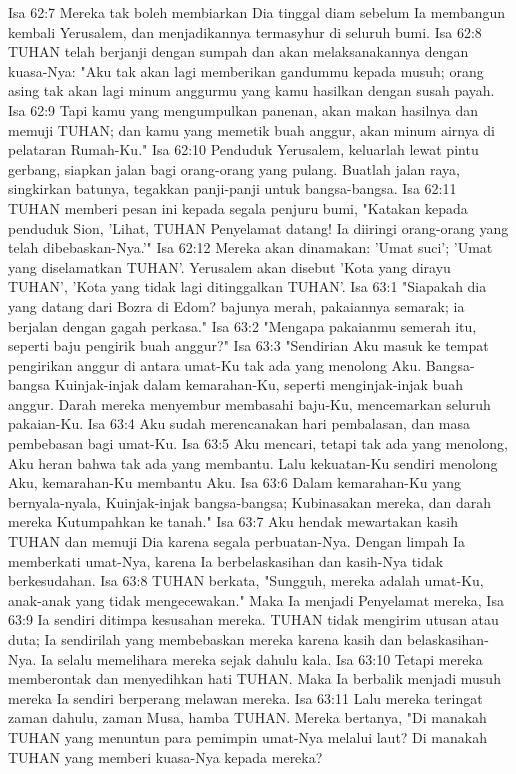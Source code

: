 Isa 62:7  Mereka tak boleh membiarkan Dia tinggal diam sebelum Ia membangun kembali Yerusalem, dan menjadikannya termasyhur di seluruh bumi.
Isa 62:8  TUHAN telah berjanji dengan sumpah dan akan melaksanakannya dengan kuasa-Nya: "Aku tak akan lagi memberikan gandummu kepada musuh; orang asing tak akan lagi minum anggurmu yang kamu hasilkan dengan susah payah.
Isa 62:9  Tapi kamu yang mengumpulkan panenan, akan makan hasilnya dan memuji TUHAN; dan kamu yang memetik buah anggur, akan minum airnya di pelataran Rumah-Ku."
Isa 62:10  Penduduk Yerusalem, keluarlah lewat pintu gerbang, siapkan jalan bagi orang-orang yang pulang. Buatlah jalan raya, singkirkan batunya, tegakkan panji-panji untuk bangsa-bangsa.
Isa 62:11  TUHAN memberi pesan ini kepada segala penjuru bumi, "Katakan kepada penduduk Sion, 'Lihat, TUHAN Penyelamat datang! Ia diiringi orang-orang yang telah dibebaskan-Nya.'"
Isa 62:12  Mereka akan dinamakan: 'Umat suci'; 'Umat yang diselamatkan TUHAN'. Yerusalem akan disebut 'Kota yang dirayu TUHAN', 'Kota yang tidak lagi ditinggalkan TUHAN'.
Isa 63:1  "Siapakah dia yang datang dari Bozra di Edom? bajunya merah, pakaiannya semarak; ia berjalan dengan gagah perkasa."
Isa 63:2  "Mengapa pakaianmu semerah itu, seperti baju pengirik buah anggur?"
Isa 63:3  "Sendirian Aku masuk ke tempat pengirikan anggur di antara umat-Ku tak ada yang menolong Aku. Bangsa-bangsa Kuinjak-injak dalam kemarahan-Ku, seperti menginjak-injak buah anggur. Darah mereka menyembur membasahi baju-Ku, mencemarkan seluruh pakaian-Ku.
Isa 63:4  Aku sudah merencanakan hari pembalasan, dan masa pembebasan bagi umat-Ku.
Isa 63:5  Aku mencari, tetapi tak ada yang menolong, Aku heran bahwa tak ada yang membantu. Lalu kekuatan-Ku sendiri menolong Aku, kemarahan-Ku membantu Aku.
Isa 63:6  Dalam kemarahan-Ku yang bernyala-nyala, Kuinjak-injak bangsa-bangsa; Kubinasakan mereka, dan darah mereka Kutumpahkan ke tanah."
Isa 63:7  Aku hendak mewartakan kasih TUHAN dan memuji Dia karena segala perbuatan-Nya. Dengan limpah Ia memberkati umat-Nya, karena Ia berbelaskasihan dan kasih-Nya tidak berkesudahan.
Isa 63:8  TUHAN berkata, "Sungguh, mereka adalah umat-Ku, anak-anak yang tidak mengecewakan." Maka Ia menjadi Penyelamat mereka,
Isa 63:9  Ia sendiri ditimpa kesusahan mereka. TUHAN tidak mengirim utusan atau duta; Ia sendirilah yang membebaskan mereka karena kasih dan belaskasihan-Nya. Ia selalu memelihara mereka sejak dahulu kala.
Isa 63:10  Tetapi mereka memberontak dan menyedihkan hati TUHAN. Maka Ia berbalik menjadi musuh mereka Ia sendiri berperang melawan mereka.
Isa 63:11  Lalu mereka teringat zaman dahulu, zaman Musa, hamba TUHAN. Mereka bertanya, "Di manakah TUHAN yang menuntun para pemimpin umat-Nya melalui laut? Di manakah TUHAN yang memberi kuasa-Nya kepada mereka?
